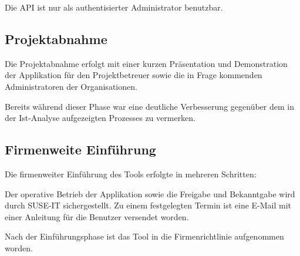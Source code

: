 Die API ist nur als authentisierter Administrator benutzbar.

\subsection{Projektabnahme}
\label{sec:Projektabnahme}
Die Projektabnahme erfolgt mit einer kurzen Präsentation und Demonstration der Applikation für den
Projektbetreuer sowie die in Frage kommenden Administratoren der Organisationen.

Bereits während dieser Phase war eine deutliche Verbesserung gegenüber dem in der Ist-Analyse
aufgezeigten Prozesses zu vermerken.

\subsection{Firmenweite Einführung}
\label{Firmenweite Einführung}
Die firmenweiter Einführung des Tools erfolgte in mehreren Schritten:

Der operative Betrieb der Applikation sowie die Freigabe und Bekanntgabe wird durch SUSE-IT
sichergestellt.
Zu einem festgelegten Termin ist eine E-Mail mit einer Anleitung für die Benutzer versendet worden.

Nach der Einführungsphase ist das Tool in die Firmenrichtlinie 
aufgenommen worden.
\pagebreak
